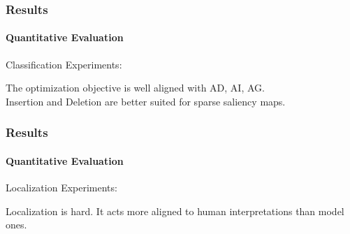 \begin{frame}[t]
    \frametitle{Results}
    \framesubtitle{Quantitative Evaluation}
    \small 
    Classification Experiments:\\
    \begin{center}
        
    \end{center}
    \pause
    The optimization objective is well aligned with AD, AI, AG.\\
    Insertion and Deletion are better suited for sparse saliency maps.
\end{frame}
%        
\begin{frame}[t]
    \frametitle{Results}
    \framesubtitle{Quantitative Evaluation}
    \small Localization Experiments:\\
    \begin{center}
        
    \end{center}
    \pause
    Localization is hard. It acts more aligned to human interpretations than model ones.
\end{frame}